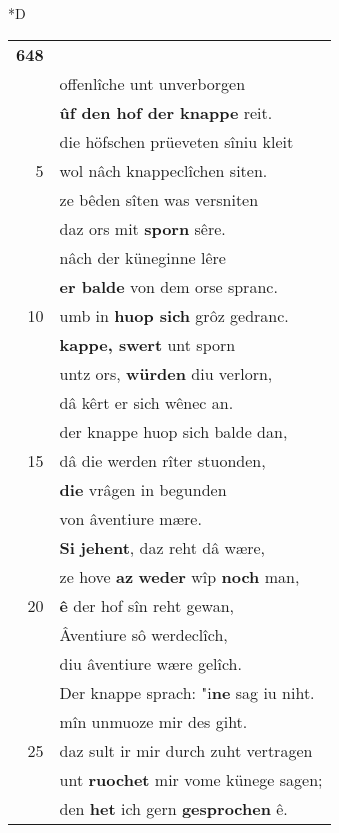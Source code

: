 \documentclass[8pt,a4paper,notitlepage]{article}
\begin{document}
\begin{table}[ht]
\begin{minipage}[t]{0.5\linewidth}
\small
\begin{center}*D
\end{center}
\begin{tabular}{rl}
\textbf{648} & \textit{\begin{large}R\end{large}}eht umbe den mitten morgen\\ 
 & offenlîche unt unverborgen\\ 
 & \textbf{ûf den hof der knappe} reit.\\ 
 & die höfschen prüeveten sîniu kleit\\ 
5 & wol nâch knappeclîchen siten.\\ 
 & ze bêden sîten was versniten\\ 
 & daz ors mit \textbf{sporn} sêre.\\ 
 & nâch der küneginne lêre\\ 
 & \textbf{er balde} von dem orse spranc.\\ 
10 & umb in \textbf{huop sich} grôz gedranc.\\ 
 & \textbf{kappe, swert} unt sporn\\ 
 & untz ors, \textbf{würden} diu verlorn,\\ 
 & dâ kêrt er sich wênec an.\\ 
 & der knappe huop sich balde dan,\\ 
15 & dâ die werden rîter stuonden,\\ 
 & \textbf{die} vrâgen in begunden\\ 
 & von âventiure mære.\\ 
 & \textbf{Si} \textbf{jehent}, daz reht dâ wære,\\ 
 & ze hove \textbf{az} \textbf{weder} wîp \textbf{noch} man,\\ 
20 & \textbf{ê} der hof sîn reht gewan,\\ 
 & Âventiure sô werdeclîch,\\ 
 & diu âventiure wære gelîch.\\ 
 & Der knappe sprach: "i\textbf{ne} sag iu niht.\\ 
 & mîn unmuoze mir des giht.\\ 
25 & daz sult ir mir durch zuht vertragen\\ 
 & unt \textbf{ruochet} mir vome künege sagen;\\ 
 & den \textbf{het} ich gern \textbf{gesprochen} ê.\\ 

\end{tabular}
\end{minipage}
\end{table}
\end{document}
